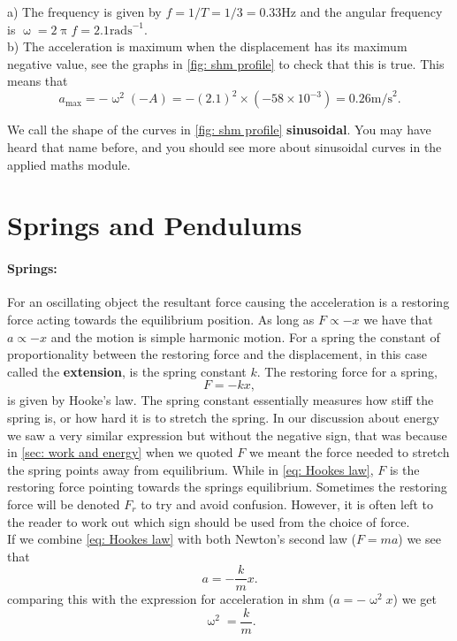 a) The frequency is given by $f=1/T=1/3=0.33\text{Hz}$ and the angular frequency is $\upomega=2\uppi f=2.1\text{rads}^{-1}$.\\

b) The acceleration is maximum when the displacement has its maximum negative value, see the graphs in \cref{fig: shm profile} to check that this is true. This means that
\begin{equation*}
a_{\text{max}}=-\upomega^{2}(-A)=-(2.1)^{2}\times (-58\times10^{-3})=0.26\text{m/s}^{2}.
\end{equation*}

We call the shape of the curves in \cref{fig: shm profile} \textbf{sinusoidal}. You may have heard that name before, and you should see more about sinusoidal curves in the applied maths module.


\section{Springs and Pendulums}
\paragraph{Springs:} For an oscillating object the resultant force causing the acceleration is a restoring force acting towards the equilibrium position. As long as $F\propto -x$ we have that $a\propto -x$ and the motion is simple harmonic motion. For a spring the constant of proportionality between the restoring force and the displacement, in this case called the \textbf{extension}, is the spring constant $k$. The restoring force for a spring,  
\begin{equation}
F=-k x,
\label{eq: Hookes law}
\end{equation}
is given by Hooke's law. The spring constant essentially measures how stiff the spring is, or how hard it is to stretch the spring.  In our discussion about energy we saw a very similar expression but without the negative sign, that was because in \cref{sec: work and energy} when we quoted $F$ we meant the force needed to stretch the spring points away from equilibrium. While in \cref{eq: Hookes law}, $F$ is the restoring force pointing towards the springs equilibrium. Sometimes the restoring force will be denoted $F_{r}$ to try and avoid confusion. However, it is often left to the reader to work out which sign should be used from the choice of force.\\

If we combine \cref{eq: Hookes law} with both Newton's second law ($F=ma$) we see that
\begin{equation*}
a=-\frac{k}{m}x.
\end{equation*}
comparing this with the expression for acceleration in shm ($a=-\upomega^{2}x$) we get 
\begin{equation}
\upomega^{2}=\frac{k}{m}.
\end{equation}


